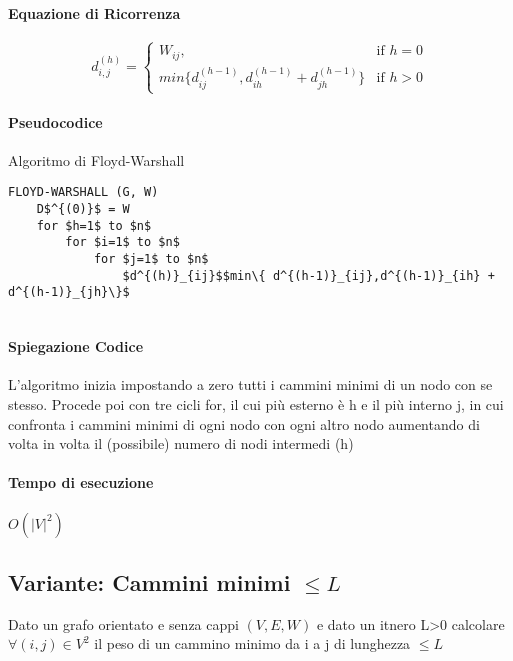 \documentclass[12pt, a4paper, openany]{book}
\begin{document}
\paragraph{Equazione di Ricorrenza}

\begin{equation*}
    d^{(h)}_{i,j}= \begin{cases}
        W_{ij},                                                & \text{if $h = 0$} \\
        min\{ d^{(h-1)}_{ij},d^{(h-1)}_{ih} + d^{(h-1)}_{jh}\} & \text{if $h > 0$}
    \end{cases}
\end{equation*}

\paragraph{Pseudocodice} Algoritmo di Floyd-Warshall

\begin{lstlisting}[mathescape=true]
FLOYD-WARSHALL (G, W)
    D$^{(0)}$ = W
    for $h=1$ to $n$
        for $i=1$ to $n$
            for $j=1$ to $n$
                $d^{(h)}_{ij}$$min\{ d^{(h-1)}_{ij},d^{(h-1)}_{ih} + d^{(h-1)}_{jh}\}$


\end{lstlisting}

\paragraph{Spiegazione Codice}
L'algoritmo inizia impostando a zero tutti i cammini minimi di un nodo con se stesso.
Procede poi con tre cicli for, il cui più esterno è h e il più interno j, in cui confronta i cammini minimi
di ogni nodo con ogni altro nodo aumentando di volta in volta il (possibile) numero di nodi intermedi (h)

\paragraph{Tempo di esecuzione}
\begin{center}
    $O(|V|^2)$
\end{center}

\subsection{Variante: Cammini minimi $\leq L$}

Dato un grafo orientato e senza cappi $(V,E,W)$ e dato un itnero L\textgreater0 calcolare
$\forall (i,j) \in V^2$ il peso di un cammino minimo da i a j di lunghezza $\leq L$
\end{document}
